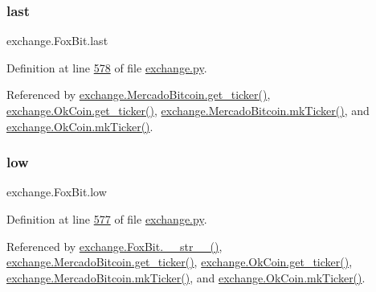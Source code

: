 \mbox{\label{classexchange_1_1_fox_bit_a5cdbc327b005014dc3b8bb6fb54a12fd}} 
\subsubsection{\texorpdfstring{last}{last}}
{\footnotesize\ttfamily exchange.\+Fox\+Bit.\+last}



Definition at line \hyperlink{exchange_8py_source_l00578}{578} of file \hyperlink{exchange_8py_source}{exchange.\+py}.



Referenced by \hyperlink{exchange_8py_source_l00651}{exchange.\+Mercado\+Bitcoin.\+get\+\_\+ticker()}, \hyperlink{exchange_8py_source_l00716}{exchange.\+Ok\+Coin.\+get\+\_\+ticker()}, \hyperlink{exchange_8py_source_l00665}{exchange.\+Mercado\+Bitcoin.\+mk\+Ticker()}, and \hyperlink{exchange_8py_source_l00730}{exchange.\+Ok\+Coin.\+mk\+Ticker()}.

\mbox{\label{classexchange_1_1_fox_bit_acd666444cff98fe477651120ddb0f915}} 
\subsubsection{\texorpdfstring{low}{low}}
{\footnotesize\ttfamily exchange.\+Fox\+Bit.\+low}



Definition at line \hyperlink{exchange_8py_source_l00577}{577} of file \hyperlink{exchange_8py_source}{exchange.\+py}.



Referenced by \hyperlink{exchange_8py_source_l00610}{exchange.\+Fox\+Bit.\+\_\+\+\_\+str\+\_\+\+\_\+()}, \hyperlink{exchange_8py_source_l00651}{exchange.\+Mercado\+Bitcoin.\+get\+\_\+ticker()}, \hyperlink{exchange_8py_source_l00716}{exchange.\+Ok\+Coin.\+get\+\_\+ticker()}, \hyperlink{exchange_8py_source_l00665}{exchange.\+Mercado\+Bitcoin.\+mk\+Ticker()}, and \hyperlink{exchange_8py_source_l00730}{exchange.\+Ok\+Coin.\+mk\+Ticker()}.

\mbox{\label{classexchange_1_1_fox_bit_abfd6daf1cbad94eb74bba4c97fe4a574}} 
